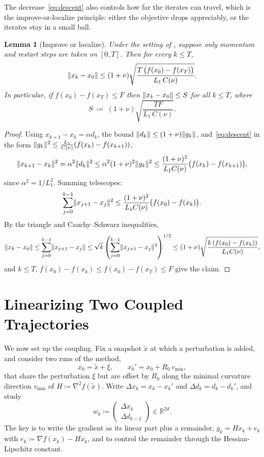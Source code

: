 \documentclass[11pt]{article}
\theoremstyle{plain}
\newtheorem{lemma}{Lemma}[section]
\theoremstyle{definition}
\theoremstyle{remark}
\DeclarePairedDelimiter{\norm}{\lVert}{\rVert}
\newcommand{\R}{\mathbb{R}}
\newcommand{\grad}{\nabla}
\newcommand{\Hess}{\nabla^2}
\newcommand{\xt}{\tilde{x}}
\begin{document}
The decrease~\eqref{eq:descent} also controls how far the iterates can
travel, which is the improve-or-localize principle: either the objective
drops appreciably, or the iterates stay in a small ball.

\begin{lemma}[Improve or localize]
\label{lem:iol}
Under the setting of , suppose only
momentum and restart steps are taken on $[0,T]$. Then for every
$k\le T$,
\begin{equation}\label{eq:iol}
  \norm{x_{k}-x_{0}}\le(1+\nu)
  \sqrt{\frac{T\,\big(f(x_{0})-f(x_{T})\big)}{L_{1}\,C(\nu)}}.
\end{equation}
In particular, if $f(x_{0})-f(x_{T})\le F$ then
$\norm{x_{k}-x_{0}}\le S$ for all $k\le T$, where
\begin{equation}\label{eq:Sdef}
  S\;\coloneqq\;(1+\nu)\sqrt{\frac{T F}{L_{1}\,C(\nu)}}.
\end{equation}
\end{lemma}

\begin{proof}
Using $x_{k+1}-x_{k}=\alpha d_{k}$, the bound
$\norm{d_{k}}\le(1+\nu)\norm{g_{k}}$, and~\eqref{eq:descent} in the
form $\norm{g_{k}}^{2}\le\frac{L_{1}}{C(\nu)}(f(x_{k})-f(x_{k+1}))$,
\[
  \norm{x_{k+1}-x_{k}}^{2}
  =\alpha^{2}\norm{d_{k}}^{2}
  \le\alpha^{2}(1+\nu)^{2}\norm{g_{k}}^{2}
  \le\frac{(1+\nu)^{2}}{L_{1}C(\nu)}\big(f(x_{k})-f(x_{k+1})\big),
\]
since $\alpha^{2}=1/L_{1}^{2}$. Summing telescopes:
\[
  \sum_{j=0}^{k-1}\norm{x_{j+1}-x_{j}}^{2}
  \le\frac{(1+\nu)^{2}}{L_{1}C(\nu)}\big(f(x_{0})-f(x_{k})\big).
\]
By the triangle and Cauchy--Schwarz inequalities,
\[
  \norm{x_{k}-x_{0}}
  \le\sum_{j=0}^{k-1}\norm{x_{j+1}-x_{j}}
  \le\sqrt{k}\left(\sum_{j=0}^{k-1}\norm{x_{j+1}-x_{j}}^{2}\right)^{1/2}
  \le(1+\nu)\sqrt{\frac{k\,(f(x_{0})-f(x_{k}))}{L_{1}C(\nu)}},
\]
and $k\le T$, $f(x_{0})-f(x_{k})\le f(x_{0})-f(x_{T})\le F$ give the
claim.
\end{proof}

\section{Linearizing Two Coupled Trajectories}
\label{sec:recurrence}
 
We now set up the coupling. Fix a snapshot $\xt$ at which a perturbation
is added, and consider two runs of the method,
\[
  x_{0}=\xt+\xi,\qquad x_{0}'=x_{0}+R_{0}\,v_{\min},
\]
that share the perturbation $\xi$ but are offset by $R_{0}$ along the
minimal curvature direction $v_{\min}$ of $H\coloneqq\Hess f(\xt)$. Write
$\Delta x_{k}=x_{k}-x_{k}'$ and $\Delta d_{k}=d_{k}-d_{k}'$, and study
\[
  w_{k}\coloneqq\begin{pmatrix}\Delta x_{k}\\[2pt]\Delta d_{k-1}\end{pmatrix}
  \in\R^{2d}.
\]
The key is to write the gradient as its linear part plus a remainder,
$g_{k}=Hx_{k}+e_{k}$ with $e_{k}\coloneqq\grad f(x_{k})-Hx_{k}$, and to
control the remainder through the Hessian-Lipschitz constant.
\end{document}
